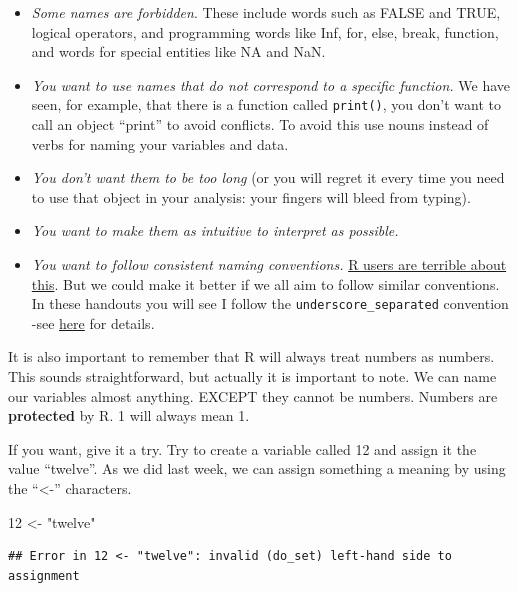\documentclass[]{book}
\newenvironment{Shaded}{\begin{snugshade}}{\end{snugshade}}
\newcommand{\DecValTok}[1]{\textcolor[rgb]{0.00,0.00,0.81}{#1}}
\newcommand{\NormalTok}[1]{#1}
\newcommand{\StringTok}[1]{\textcolor[rgb]{0.31,0.60,0.02}{#1}}
\begin{document}
\begin{itemize}
\item
  \emph{Some names are forbidden}. These include words such as FALSE and TRUE, logical operators, and programming words like Inf, for, else, break, function, and words for special entities like NA and NaN.
\item
  \emph{You want to use names that do not correspond to a specific function.} We have seen, for example, that there is a function called \texttt{print()}, you don't want to call an object ``print'' to avoid conflicts. To avoid this use nouns instead of verbs for naming your variables and data.
\item
  \emph{You don't want them to be too long} (or you will regret it every time you need to use that object in your analysis: your fingers will bleed from typing).
\item
  \emph{You want to make them as intuitive to interpret as possible.}
\item
  \emph{You want to follow consistent naming conventions.} \href{http://journal.r-project.org/archive/2012-2/RJournal_2012-2_Baaaath.pdf}{R users are terrible about this}. But we could make it better if we all aim to follow similar conventions. In these handouts you will see I follow the \texttt{underscore\_separated} convention -see \href{http://robinlovelace.net/r/2014/07/15/naming-conventions-r.html}{here} for details.
\end{itemize}

It is also important to remember that R will always treat numbers as numbers. This sounds straightforward, but actually it is important to note. We can name our variables almost anything. EXCEPT they cannot be numbers. Numbers are \textbf{protected} by R. 1 will always mean 1.

If you want, give it a try. Try to create a variable called 12 and assign it the value ``twelve''. As we did last week, we can assign something a meaning by using the ``\textless{}-'' characters.

\begin{Shaded}
\begin{Highlighting}[]
\DecValTok{12}\NormalTok{ <-}\StringTok{ "twelve"}
\end{Highlighting}
\end{Shaded}

\begin{verbatim}
## Error in 12 <- "twelve": invalid (do_set) left-hand side to assignment
\end{verbatim}
\end{document}
